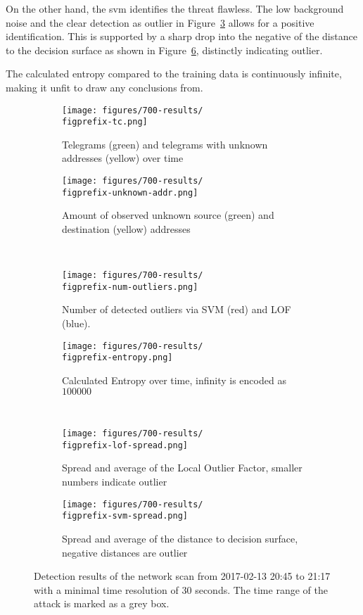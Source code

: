 On the other hand, the \gls{svm} identifies the threat flawless. The low background noise and the clear detection as outlier in Figure~\ref{fig:results:scan:outlier} allows for a positive identification. This is supported by a sharp drop into the negative of the distance to the decision surface as shown in Figure~\ref{fig:results:scan:svm}, distinctly indicating outlier.

The calculated entropy compared to the training data is continuously infinite, making it unfit to draw any conclusions from.


\begin{figure}[H]
	\newcommand{\figwith}{0.49\textwidth}
	\newcommand{\figprefix}{scan}
	\centering
	
	\begin{subfigure}[b]{\figwith}
		\texttt{[image: figures/700-results/\\figprefix-tc.png]}
		\caption{Telegrams (green) and telegrams with unknown addresses (yellow) over time}
		\label{fig:results:\figprefix:tc}
	\end{subfigure}
	\hfil
	\begin{subfigure}[b]{\figwith}
		\texttt{[image: figures/700-results/\\figprefix-unknown-addr.png]}
		\caption{Amount of observed unknown source (green) and destination (yellow) addresses}
		\label{fig:results:\figprefix:addr}
	\end{subfigure}
	\\[1.5mm]
	\begin{subfigure}[b]{\figwith}
		\texttt{[image: figures/700-results/\\figprefix-num-outliers.png]}
		\caption{Number of detected outliers via SVM (red) and LOF (blue).}
		\label{fig:results:\figprefix:outlier}
	\end{subfigure}
	\hfil
	\begin{subfigure}[b]{\figwith}
		\texttt{[image: figures/700-results/\\figprefix-entropy.png]}
		\caption{Calculated Entropy over time, infinity is encoded as $100 000$}
		\label{fig:results:\figprefix:entropy}
	\end{subfigure}
	\\[1.5mm]
	\begin{subfigure}[b]{\figwith}
		\texttt{[image: figures/700-results/\\figprefix-lof-spread.png]}
		\caption{Spread and average of the Local Outlier Factor, smaller numbers indicate outlier}
		\label{fig:results:\figprefix:lof}
	\end{subfigure}
	\hfil
	\begin{subfigure}[b]{\figwith}
		\texttt{[image: figures/700-results/\\figprefix-svm-spread.png]}
		\caption{Spread and average of the distance to decision surface, negative distances are outlier}
		\label{fig:results:\figprefix:svm}
	\end{subfigure}
	
	\caption[Detection results of the network scan]{Detection results of the network scan from 2017-02-13 20:45 to 21:17 with a minimal time resolution of 30 seconds. The time range of the attack is marked as a grey box.}
	\label{fig:results:\figprefix}
	
\end{figure}

